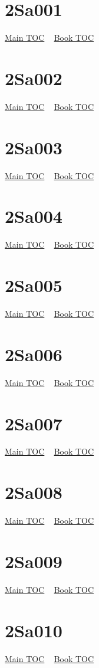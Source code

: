 \documentclass{book}
\begin{document}
  \section{2Sa001}\hyperlink{toc}{Main TOC} ~ \hyperref[subsec:2Sa]{Book TOC} 
  \section{2Sa002}\hyperlink{toc}{Main TOC} ~ \hyperref[subsec:2Sa]{Book TOC} 
  \section{2Sa003}\hyperlink{toc}{Main TOC} ~ \hyperref[subsec:2Sa]{Book TOC} 
  \section{2Sa004}\hyperlink{toc}{Main TOC} ~ \hyperref[subsec:2Sa]{Book TOC} 
  \section{2Sa005}\hyperlink{toc}{Main TOC} ~ \hyperref[subsec:2Sa]{Book TOC} 
  \section{2Sa006}\hyperlink{toc}{Main TOC} ~ \hyperref[subsec:2Sa]{Book TOC} 
  \section{2Sa007}\hyperlink{toc}{Main TOC} ~ \hyperref[subsec:2Sa]{Book TOC} 
  \section{2Sa008}\hyperlink{toc}{Main TOC} ~ \hyperref[subsec:2Sa]{Book TOC} 
  \section{2Sa009}\hyperlink{toc}{Main TOC} ~ \hyperref[subsec:2Sa]{Book TOC} 
  \section{2Sa010}\hyperlink{toc}{Main TOC} ~ \hyperref[subsec:2Sa]{Book TOC} 
\end{document}
